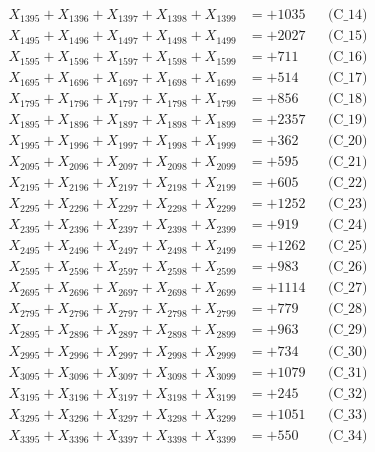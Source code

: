 \documentclass[a4paper,10pt]{article}
\begin{document}
{\begin{align}
X_{1395} + X_{1396} + X_{1397} + X_{1398} + X_{1399} &= +1035 && \text{(C\_14)} \\
X_{1495} + X_{1496} + X_{1497} + X_{1498} + X_{1499} &= +2027 && \text{(C\_15)} \\
\allowbreak
X_{1595} + X_{1596} + X_{1597} + X_{1598} + X_{1599} &= +711 && \text{(C\_16)} \\
X_{1695} + X_{1696} + X_{1697} + X_{1698} + X_{1699} &= +514 && \text{(C\_17)} \\
X_{1795} + X_{1796} + X_{1797} + X_{1798} + X_{1799} &= +856 && \text{(C\_18)} \\
X_{1895} + X_{1896} + X_{1897} + X_{1898} + X_{1899} &= +2357 && \text{(C\_19)} \\
X_{1995} + X_{1996} + X_{1997} + X_{1998} + X_{1999} &= +362 && \text{(C\_20)} \\
\allowbreak
X_{2095} + X_{2096} + X_{2097} + X_{2098} + X_{2099} &= +595 && \text{(C\_21)} \\
X_{2195} + X_{2196} + X_{2197} + X_{2198} + X_{2199} &= +605 && \text{(C\_22)} \\
X_{2295} + X_{2296} + X_{2297} + X_{2298} + X_{2299} &= +1252 && \text{(C\_23)} \\
X_{2395} + X_{2396} + X_{2397} + X_{2398} + X_{2399} &= +919 && \text{(C\_24)} \\
X_{2495} + X_{2496} + X_{2497} + X_{2498} + X_{2499} &= +1262 && \text{(C\_25)} \\
\allowbreak
X_{2595} + X_{2596} + X_{2597} + X_{2598} + X_{2599} &= +983 && \text{(C\_26)} \\
X_{2695} + X_{2696} + X_{2697} + X_{2698} + X_{2699} &= +1114 && \text{(C\_27)} \\
X_{2795} + X_{2796} + X_{2797} + X_{2798} + X_{2799} &= +779 && \text{(C\_28)} \\
X_{2895} + X_{2896} + X_{2897} + X_{2898} + X_{2899} &= +963 && \text{(C\_29)} \\
X_{2995} + X_{2996} + X_{2997} + X_{2998} + X_{2999} &= +734 && \text{(C\_30)} \\
\allowbreak
X_{3095} + X_{3096} + X_{3097} + X_{3098} + X_{3099} &= +1079 && \text{(C\_31)} \\
X_{3195} + X_{3196} + X_{3197} + X_{3198} + X_{3199} &= +245 && \text{(C\_32)} \\
X_{3295} + X_{3296} + X_{3297} + X_{3298} + X_{3299} &= +1051 && \text{(C\_33)} \\
X_{3395} + X_{3396} + X_{3397} + X_{3398} + X_{3399} &= +550 && \text{(C\_34)} \\

\end{align}}
\end{document}
